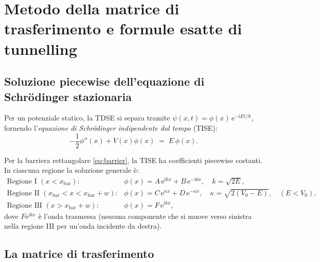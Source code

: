 \documentclass[12pt, a4paper]{article}
\newcommand{\ii}{\mathrm{i}}          %
\newcommand{\ee}{\mathrm{e}}          %
\begin{document}
\section{Metodo della matrice di trasferimento e formule esatte di tunnelling}
\label{app:transfer}

\subsection{Soluzione piecewise dell'equazione di Schr\"{o}dinger stazionaria}

Per un potenziale statico, la TDSE si separa tramite
$\psi(x,t) = \phi(x)\,\ee^{-\ii Et/\hbar}$, fornendo
l'\emph{equazione di Schr\"{o}dinger indipendente dal tempo} (TISE):
\begin{equation}
  -\frac{1}{2}\phi''(x) + V(x)\phi(x) \;=\; E\,\phi(x).
\end{equation}

Per la barriera rettangolare \eqref{eq:barrier}, la TISE ha
coefficienti piecewise costanti.  In ciascuna regione la soluzione
generale è:
\begin{align}
  \text{Regione I } (x < x_\text{bar}):&\quad
    \phi(x) = A\,\ee^{\ii kx} + B\,\ee^{-\ii kx},
    \quad k = \sqrt{2E}, \\
  \text{Regione II } (x_\text{bar} < x < x_\text{bar}+w):&\quad
    \phi(x) = C\,\ee^{\kappa x} + D\,\ee^{-\kappa x},
    \quad \kappa = \sqrt{2(V_0-E)},\quad (E<V_0), \\
  \text{Regione III } (x > x_\text{bar}+w):&\quad
    \phi(x) = F\,\ee^{\ii kx},
\end{align}
dove $F\ee^{\ii kx}$ è l'onda trasmessa (nessuna componente che si
muove verso sinistra nella regione III per un'onda incidente da destra).

\subsection{La matrice di trasferimento}
\end{document}

